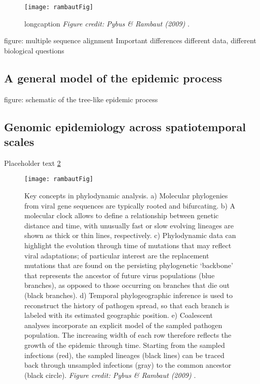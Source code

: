 \begin{figure}[ht]
  \centering
  \texttt{[image: rambautFig]}
  \caption[shortcaptionforindex]{longcaption \textit{Figure credit: Pybus \& Rambaut (2009)} \citep{pybus2009evolutionary}.}
  \label{fig:phylogeneticsOverview}
\end{figure}

figure: multiple sequence alignment
Important differences
different data, different biological questions
\subsection{A general model of the epidemic process}
figure: schematic of the tree-like epidemic process
\subsection{Genomic epidemiology across spatiotemporal scales}
Placeholder text \ref{fig:phylogeneticsOverview}
\begin{figure}[ht]
  \centering
  \texttt{[image: rambautFig]}
  \caption[Applications of phylodynamics]{Key concepts in phylodynamic analysis. 
  a) Molecular phylogenies from viral gene sequences are typically rooted and bifurcating.
  b) A molecular clock allows to define a relationship between genetic distance and time, with unusually fast or slow evolving lineages are shown as thick or thin lines, respectively.
  c) Phylodynamic data can highlight the evolution through time of mutations that may reflect viral adaptations; of particular interest are the replacement mutations that are found on the persisting phylogenetic `backbone' that represents the ancestor of future virus populations (blue branches), as opposed to those occurring on branches that die out (black branches).
  d) Temporal phylogeographic inference is used to reconstruct the history of pathogen spread, so that each branch is labeled with its estimated geographic position.
  e) Coalescent analyses incorporate an explicit model of the sampled pathogen population.
  The increasing width of each row therefore reflects the growth of the epidemic through time. Starting from the sampled infections (red), the sampled lineages (black lines) can be traced back through unsampled infections (gray) to the common ancestor (black circle).
  \textit{Figure credit: Pybus \& Rambaut (2009)} \citep{pybus2009evolutionary}.
  }
  \label{fig:phylogeneticsOverview}
\end{figure}


